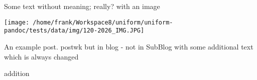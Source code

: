 \documentclass[a4paper,10pt]{scrbook}
\begin{document}
Some text without meaning; really? with an image

\texttt{[image: /home/frank/Workspace8/uniform/uniform-pandoc/tests/data/img/120-2026\_IMG.JPG]}

An example post. postwk but in blog - not in SubBlog with some
additional text which is always changed

addition

\printindex
\end{document}
